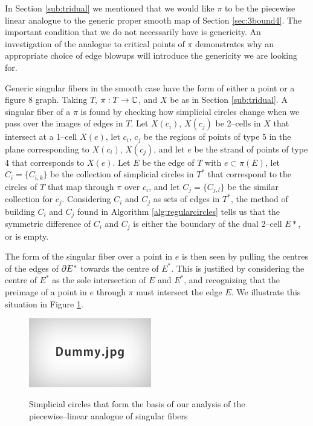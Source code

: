 In Section \ref{sub:tridual} we mentioned that we would like $\pi$ to be the piecewise linear analogue to the generic proper smooth map of Section \ref{sec:3bound4}.
The important condition that we do not necessarily have is genericity.
An investigation of the analogue to critical points of $\pi$ demonstrates why an appropriate choice of edge blowups will introduce the genericity we are looking for.

Generic singular fibers in the smooth case have the form of either a point or a figure 8 graph.
Taking $T$, $\pi:T\to\mathbb{C}$, and $X$ be as in Section \ref{sub:tridual}.
A singular fiber of a $\pi$ is found by checking how simplicial circles change when we pass over the images of edges in $T$.
Let $X(c_i)$, $X(c_j)$ be 2--cells in $X$ that intersect at a 1--cell $X(e)$, let $c_i$, $c_j$ be the regions of points of type 5 in the plane corresponding to $X(c_i)$, $X(c_j)$, and let $e$ be the strand of points of type 4 that corresponds to $X(e)$.
Let $E$ be the edge of $T$ with $e\subset\pi(E)$, let $C_i=\{C_{i,k}\}$ be the collection of simplicial circles in $T^*$ that correspond to the circles of $T$ that map through $\pi$ over $c_i$, and let $C_j=\{C_{j,l}\}$ be the similar collection for $c_j$.
Considering $C_i$ and $C_j$ as sets of edges in $T^*$, the method of building $C_i$ and $C_j$ found in Algorithm \ref{alg:regularcircles} tells us that the symmetric difference of $C_i$ and $C_j$ is either the boundary of the dual 2--cell $E*$, or is empty.

The form of the singular fiber over a point in $e$ is then seen by pulling the centres of the edges of $\partial E^*$ towards the centre of $E^*$.
This is justified by considering the centre of $E^*$ as the sole intersection of $E$ and $E^*$, and recognizing that the preimage of a point in $e$ through $\pi$ must intersect the edge $E$.
We illustrate this situation in Figure \ref{fig:plsingularities}.

\begin{figure}
	\centering
	\captionsetup{justification=centering}
	\caption{Simplicial circles that form the basis of our analysis of the piecewise--linear analogue of singular fibers}
	\includegraphics[height=3cm]{figures/dummy.jpg}
	\label{fig:plsingularities}
\end{figure}

